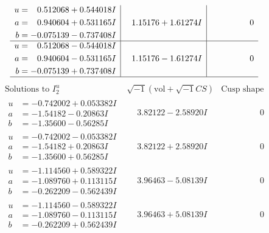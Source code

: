 \documentclass[1p]{elsarticle_modified}
\theoremstyle{definition}
\newcommand{\I}{\sqrt{-1}}
\begin{document}
$$\begin{array}{c|c|c}
\begin{aligned}
u &= \phantom{-}0.512068 + 0.544018 I \\
a &= \phantom{-}0.940604 + 0.531165 I \\
b &= -0.075139 - 0.737408 I\end{aligned}
 & \phantom{-}1.15176 + 1.61274 I & \phantom{-0.000000 } 0 \\ \hline\begin{aligned}
u &= \phantom{-}0.512068 - 0.544018 I \\
a &= \phantom{-}0.940604 - 0.531165 I \\
b &= -0.075139 + 0.737408 I\end{aligned}
 & \phantom{-}1.15176 - 1.61274 I & \phantom{-0.000000 } 0\\
 \hline 
 \end{array}$$\newpage$$\begin{array}{c|c|c}  
\text{Solutions to }I^u_{2}& \I (\text{vol} + \sqrt{-1}CS) & \text{Cusp shape}\\
 \hline 
\begin{aligned}
u &= -0.742002 + 0.053382 I \\
a &= -1.54182 - 0.20863 I \\
b &= -1.35600 - 0.56285 I\end{aligned}
 & \phantom{-}3.82122 - 2.58920 I & \phantom{-0.000000 } 0 \\ \hline\begin{aligned}
u &= -0.742002 - 0.053382 I \\
a &= -1.54182 + 0.20863 I \\
b &= -1.35600 + 0.56285 I\end{aligned}
 & \phantom{-}3.82122 + 2.58920 I & \phantom{-0.000000 } 0 \\ \hline\begin{aligned}
u &= -1.114560 + 0.589322 I \\
a &= -1.089760 + 0.113115 I \\
b &= -0.262209 - 0.562439 I\end{aligned}
 & \phantom{-}3.96463 - 5.08139 I & \phantom{-0.000000 } 0 \\ \hline\begin{aligned}
u &= -1.114560 - 0.589322 I \\
a &= -1.089760 - 0.113115 I \\
b &= -0.262209 + 0.562439 I\end{aligned}
 & \phantom{-}3.96463 + 5.08139 I & \phantom{-0.000000 } 0 \\ \hline\begin{aligned}

\end{aligned}
\end{array}$$
\end{document}
